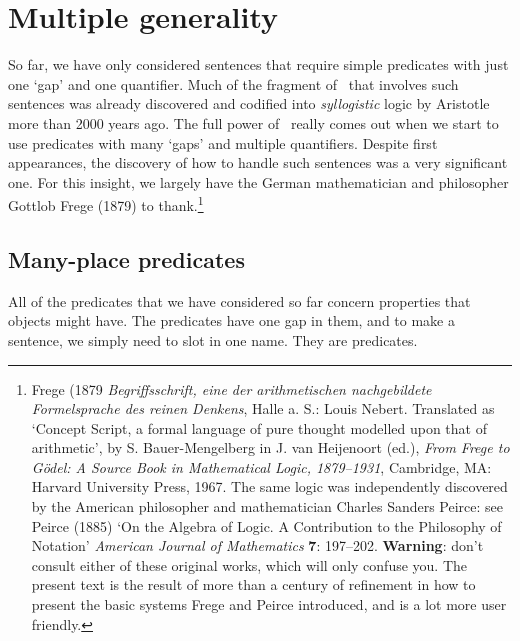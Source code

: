 \chapter{Multiple generality}\label{s:MultipleGenerality}
So far, we have only considered sentences that require simple predicates with just one `gap' and one quantifier. Much of the fragment of \FOL\ that involves such sentences was already discovered and codified into \emph{syllogistic} logic by Aristotle more than 2000 years ago. The full power of \FOL\ really comes out when we start to use predicates with many `gaps' and multiple quantifiers. Despite first appearances, the discovery of how to handle such sentences was a very significant one.  For this insight, we largely have the German mathematician and philosopher Gottlob Frege (1879) to thank.\footnote{Frege (1879 \emph{Begriffsschrift, eine der arithmetischen nachgebildete Formelsprache des reinen Denkens}, Halle a. S.: Louis Nebert. Translated as `Concept Script, a formal language of pure thought modelled upon that of arithmetic', by S. Bauer-Mengelberg in J. van Heijenoort (ed.), \emph{From Frege to Gödel: A Source Book in Mathematical Logic, 1879–1931}, Cambridge, MA: Harvard University Press, 1967. The same logic was independently discovered by the American philosopher and mathematician Charles Sanders Peirce: see Peirce (1885) `On the Algebra of Logic. A Contribution to the Philosophy of Notation' \emph{American Journal of Mathematics} \textbf{7}: 197–202. \textbf{Warning}: don't consult either of these original works, which will only confuse you. The present text is the result of more than a century of refinement in how to present the basic systems Frege and Peirce introduced, and is a lot more user friendly.}


\section{Many-place predicates}
All of the predicates that we have considered so far concern properties that objects might have. The predicates have one gap in them, and to make a sentence, we simply need to slot in one name. They are  predicates.

